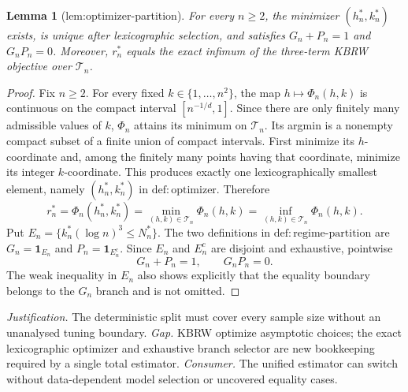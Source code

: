 \documentclass{article}
\newtheorem{lemma}{Lemma}
\begin{document}
\begin{lemma}[lem:optimizer-partition]\label{lem:optimizer-partition}
For every \(n\geq2\), the minimizer \((h_n^*,k_n^*)\) exists, is unique after lexicographic selection, and satisfies \(G_n+P_n=1\) and \(G_nP_n=0\). Moreover, \(r_n^*\) equals the exact infimum of the three-term KBRW objective over \(\mathcal T_n\).
\end{lemma}
\begin{proof}
Fix \(n\ge2\).  For every fixed \(k\in\{1,\ldots,n^2\}\), the map \(h\mapsto\Phi_n(h,k)\) is continuous on the compact interval \([n^{-1/d},1]\).  Since there are only finitely many admissible values of \(k\), \(\Phi_n\) attains its minimum on \(\mathcal T_n\).  Its argmin is a nonempty compact subset of a finite union of compact intervals.  First minimize its \(h\)-coordinate and, among the finitely many points having that coordinate, minimize its integer \(k\)-coordinate.  This produces exactly one lexicographically smallest element, namely \((h_n^*,k_n^*)\) in \(\mathrm{def:optimizer}\).  Therefore
\[
 r_n^*=\Phi_n(h_n^*,k_n^*)
 =\min_{(h,k)\in\mathcal T_n}\Phi_n(h,k)
 =\inf_{(h,k)\in\mathcal T_n}\Phi_n(h,k).
\]
Put \(E_n=\{k_n^*(\log n)^3\le N_n^*\}\).  The two definitions in \(\mathrm{def:regime\mbox{-}partition}\) are \(G_n=\mathbf 1_{E_n}\) and \(P_n=\mathbf 1_{E_n^c}\).  Since \(E_n\) and \(E_n^c\) are disjoint and exhaustive, pointwise
\[
 G_n+P_n=1,\qquad G_nP_n=0.
\]
The weak inequality in \(E_n\) also shows explicitly that the equality boundary belongs to the \(G_n\) branch and is not omitted.
\end{proof}
\par\smallskip\noindent \textit{Justification.} The deterministic split must cover every sample size without an unanalysed tuning boundary. \textit{Gap.} KBRW optimize asymptotic choices; the exact lexicographic optimizer and exhaustive branch selector are new bookkeeping required by a single total estimator. \textit{Consumer.} The unified estimator can switch without data-dependent model selection or uncovered equality cases.
\end{document}

